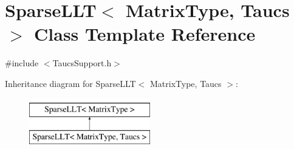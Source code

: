 \hypertarget{class_sparse_l_l_t_3_01_matrix_type_00_01_taucs_01_4}{\section{Sparse\-L\-L\-T$<$ Matrix\-Type, Taucs $>$ Class Template Reference}
\label{class_sparse_l_l_t_3_01_matrix_type_00_01_taucs_01_4}
}


{\ttfamily \#include $<$Taucs\-Support.\-h$>$}

Inheritance diagram for Sparse\-L\-L\-T$<$ Matrix\-Type, Taucs $>$\-:\begin{figure}[H]
\begin{center}
\leavevmode
\includegraphics[height=2.000000cm]{class_sparse_l_l_t_3_01_matrix_type_00_01_taucs_01_4}
\end{center}
\end{figure}
